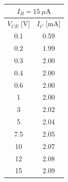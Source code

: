 \documentclass[11pt,a4paper]{jsarticle}
\begin{document}
\begin{table}[H]
\begin{minipage}{0.3\textwidth}
\begin{tabular}{cc}
\toprule
\multicolumn{2}{c}{$I_B=15~\mu\mathrm{A}$}\\
\midrule
$V_{CE}$ [V] & $I_C$ [mA]\\
\midrule
0.1&0.59\\
0.2&1.99\\
0.3&2.00\\
0.4&2.00\\
0.6&2.00\\
1&2.00\\
3&2.02\\
5&2.04\\
7.5&2.05\\
10&2.07\\
12&2.08\\
15&2.09\\
\bottomrule
\end{tabular}
\end{minipage}

\vspace{5mm}


\end{table}
\end{document}
